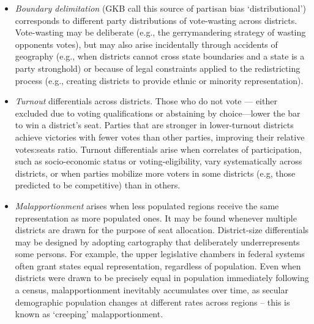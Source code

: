 \documentclass[letter,12pt]{article}
\begin{document}
\begin{itemize}
\item \emph{Boundary delimitation} (GKB call this source of partisan bias `distributional') corresponds to different party distributions of vote-wasting across districts. Vote-wasting may be deliberate (e.g., the gerrymandering strategy of wasting opponents votes), but may also arise incidentally through accidents of geography (e.g., when districts cannot cross state boundaries and a state is a party stronghold) or because of legal constraints applied to the redistricting process (e.g., creating districts to provide ethnic or minority representation).
\item \emph{Turnout} differentials across districts. Those who do not vote --- either excluded due to voting qualifications or abstaining by choice---lower the bar to win a district's seat. Parties that are stronger in lower-turnout districts achieve victories with fewer votes than other parties, improving their relative votes:seats ratio. Turnout differentials arise when correlates of participation, such as socio-economic status or voting-eligibility, vary systematically across districts, or when parties mobilize more voters in some districts (e.g, those predicted to be competitive) than in others.
\item \emph{Malapportionment} arises when less populated regions receive the same representation as more populated ones. It may be found whenever multiple districts are drawn for the purpose of seat allocation. District-size differentials may be designed by adopting cartography that deliberately underrepresents some persons. For example, the upper legislative chambers in federal systems often grant states equal representation, regardless of population. Even when districts were drawn to be precisely equal in population immediately following a census, malapportionment inevitably accumulates over time, as secular demographic population changes at different rates across regions --  this is known as `creeping' malapportionment.
\end{itemize} 

\end{document}
